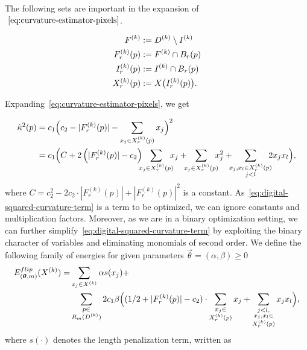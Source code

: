 The following sets are important in the expansion of $~\cref{eq:curvature-estimator-pixels}$.


\begin{align*}
	F^{(k)} &:= D^{(k)} \setminus I^{(k)} \\
	F_r^{(k)}(p) &:= F^{(k)} \cap B_r(p)\\
	I_r^{(k)}(p) &:= I^{(k)} \cap B_r(p) \\
	X_r^{(k)}(p) &:= X\big( I_r^{(k)}(p) \big). \\
\end{align*}


Expanding~\cref{eq:curvature-estimator-pixels}, we get 

\begin{align}
  \hat{\kappa}^2(p) &= c_1\Big( c_2 - |F_{r}^{(k)}(p)| - \sum_{x_j \in X_r^{(k)}(p)} {x_j} \Big)^2 \nonumber \\
   &= c_1 \Big( C + 2\left( |F_{r}^{(k)}(p)| - c_2 \right) \hspace{-2mm}\sum_{x_j \in X_{r}^{(k)}(p)}\hspace{-2mm}{x_j} + \hspace{-2mm}\sum_{x_j \in X_{r}^{(k)}(p)}\hspace{-2mm}{x_j^2} + \hspace{-2mm}\sum_{ \substack{x_j,x_l \in X_{r}^{(k)}(p) \\ j<l} }\hspace{-2mm}{2x_jx_l}  \Big),
   \label{eq:digital-squared-curvature-term}
\end{align}
where $C=c_2^2 - 2c_2 \cdot |F_{r}^{(k)}(p)| + |F_{r}^{(k)}(p)|^2$ is a constant. As~\cref{eq:digital-squared-curvature-term} is a term to be optimized, we can ignore constants and multiplication factors. Moreover, as we are in a binary optimization setting, we can  further simplify~\cref{eq:digital-squared-curvature-term} by exploiting the binary character of variables and eliminating monomials of second order. We define the following family
of energies for given parameters $\vec{\theta}=(\alpha,\beta ) \geq 0$
\begin{align}
  E_{(\bm{\theta},m)}^{flip}(X^{(k)}) =& \sum_{x_j \in X^{(k)}}{\alpha s(x_j)} + \nonumber \\ 
  & \sum_{ \substack{p \in \\ R_m(D^{(k)})}}{ 2c_1 \beta  \Big( { (1/2+ |F_{r}^{(k)}(p)|-c_2) \cdot \sum_{ \substack{ x_j \in \\ X_{r}^{(k)}(p)}}{x_j} } + \sum_{ \substack{j<l, \\ x_j,x_l \in \\ X_{r}^{(k)}(p) } }{x_jx_l} \Big) },
  \label{eq:energy-family}
\end{align}
where $s(\cdot)$ denotes the length penalization term, written as

